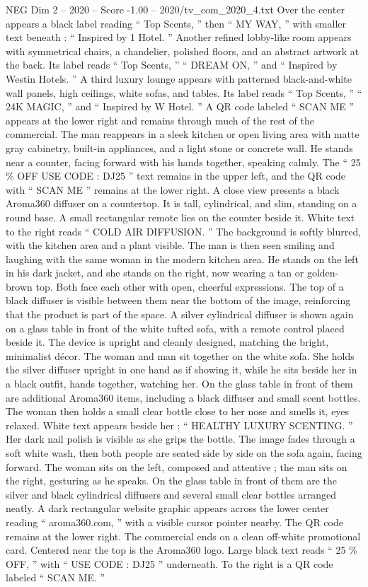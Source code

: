 \begin{textsample}{NEG Dim 2 – 2020 – Score -1.00 – 2020/tv\_com\_2020\_4.txt}
Over the center appears a black label reading “ Top Scents, ” then “ MY WAY, ” with smaller text beneath : “ Inspired by 1 Hotel. ” Another refined lobby-like room appears with symmetrical chairs, a chandelier, polished floors, and an abstract artwork at the back.
Its label reads “ Top Scents, ” “ DREAM ON, ” and “ Inspired by Westin Hotels. ” A third luxury lounge appears with patterned black-and-white wall panels, high ceilings, white sofas, and tables.
Its label reads “ Top Scents, ” “ 24K MAGIC, ” and “ Inspired by W Hotel. ” A QR code labeled “ SCAN ME ” appears at the lower right and remains through much of the rest of the commercial.
The man reappears in a sleek kitchen or open living area with matte gray cabinetry, built-in appliances, and a light stone or concrete wall.
He stands near a counter, facing forward with his hands together, speaking calmly.
The “ 25 \% OFF USE CODE : DJ25 ” text remains in the upper left, and the QR code with “ SCAN ME ” remains at the lower right.
A close view presents a black Aroma360 diffuser on a countertop.
It is tall, cylindrical, and slim, standing on a round base.
A small rectangular remote lies on the counter beside it.
White text to the right reads “ COLD AIR DIFFUSION. ” The background is softly blurred, with the kitchen area and a plant visible.
The man is then seen smiling and laughing with the same woman in the modern kitchen area.
He stands on the left in his dark jacket, and she stands on the right, now wearing a tan or golden-brown top.
Both face each other with open, cheerful expressions.
The top of a black diffuser is visible between them near the bottom of the image, reinforcing that the product is part of the space.
A silver cylindrical diffuser is shown again on a glass table in front of the white tufted sofa, with a remote control placed beside it.
The device is upright and cleanly designed, matching the bright, minimalist décor.
The woman and man sit together on the white sofa.
She holds the silver diffuser upright in one hand as if showing it, while he sits beside her in a black outfit, hands together, watching her.
On the glass table in front of them are additional Aroma360 items, including a black diffuser and small scent bottles.
The woman then holds a small clear bottle close to her nose and smells it, eyes relaxed.
White text appears beside her : “ HEALTHY LUXURY SCENTING. ” Her dark nail polish is visible as she grips the bottle.
The image fades through a soft white wash, then both people are seated side by side on the sofa again, facing forward.
The woman sits on the left, composed and attentive ; the man sits on the right, gesturing as he speaks.
On the glass table in front of them are the silver and black cylindrical diffusers and several small clear bottles arranged neatly.
A dark rectangular website graphic appears across the lower center reading “ aroma360.com, ” with a visible cursor pointer nearby.
The QR code remains at the lower right.
The commercial ends on a clean off-white promotional card.
Centered near the top is the Aroma360 logo.
Large black text reads “ 25 \% OFF, ” with “ USE CODE : DJ25 ” underneath.
To the right is a QR code labeled “ SCAN ME. ”

\end{textsample}
